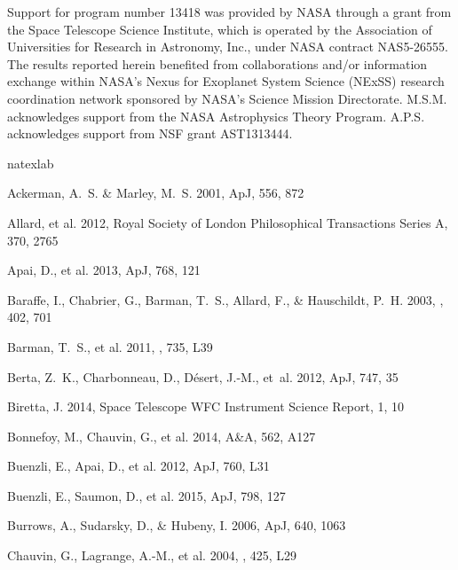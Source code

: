 \documentclass[apj]{emulateapj}
\begin{document}
\acknowledgments

Support for program number 13418 was provided by NASA through a grant
from the Space Telescope Science Institute, which is operated by the
Association of Universities for Research in Astronomy, Inc., under
NASA contract NAS5-26555. The results reported herein benefited from
collaborations and/or information exchange within NASA's Nexus for
Exoplanet System Science (NExSS) research coordination network
sponsored by NASA's Science Mission Directorate. M.S.M. acknowledges
support from the NASA Astrophysics Theory Program. A.P.S. acknowledges
support from NSF grant AST1313444.
%

\begin{thebibliography}{42}
\expandafter\ifx\csname natexlab\endcsname\relax\def\natexlab#1{#1}\fi

Ackerman, A.~S. \& Marley, M.~S. 2001, ApJ, 556, 872

{Allard}, et al. 2012, Royal Society of London
  Philosophical Transactions Series A, 370, 2765

Apai, D., et al. 2013, ApJ, 768, 121

{Baraffe}, I., {Chabrier}, G., {Barman}, T.~S., {Allard}, F., \& {Hauschildt},
  P.~H. 2003, \aap, 402, 701

{Barman}, T.~S., et al. 2011,
  \apjl, 735, L39

Berta, Z.~K., Charbonneau, D., D\'{e}sert, J.-M., {et~al.} 2012, ApJ, 747, 35

Biretta, J. 2014, Space Telescope WFC Instrument Science Report, 1, 10

Bonnefoy, M., Chauvin, G., et al. 2014, A\&A, 562, A127

Buenzli, E., Apai, D., et al. 2012, ApJ, 760, L31

Buenzli, E., Saumon, D., et al. 2015, ApJ, 798, 127


Burrows, A., Sudarsky, D., \& Hubeny, I. 2006, ApJ, 640, 1063

{Chauvin}, G., {Lagrange}, A.-M., et al. 2004, \aap, 425, L29


\end{thebibliography}
\end{document}
